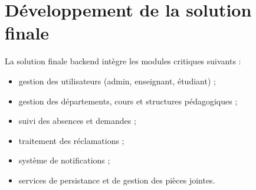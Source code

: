 \section{Développement de la solution finale}
La solution finale backend intègre les modules critiques suivants :
\begin{itemize}
	\item gestion des utilisateurs (admin, enseignant, étudiant) ;
	\item gestion des départements, cours et structures pédagogiques ;
	\item suivi des absences et demandes ;
	\item traitement des réclamations ;
	\item système de notifications ;
	\item services de persistance et de gestion des pièces jointes.
\end{itemize}
